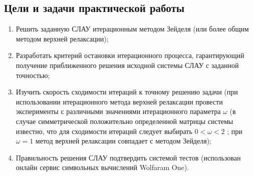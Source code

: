 \documentclass[a4paper,12pt,titlepage,finall]{article}
\begin{document}
\subsection{Цели и задачи практической работы}
\begin{enumerate}
\item
Решить заданную СЛАУ итерационным методом Зейделя (или более общим
методом верхней релаксации);
\item
Разработать критерий остановки итерационного процесса, гарантирующий
получение приближенного решения исходной системы СЛАУ с заданной
точностью;
\item
Изучить скорость сходимости итераций к точному решению задачи (при
использовании итерационного метода верхней релаксации провести эксперименты
с различными значениями итерационного параметра $\omega$ (в случае симметрической
положительно определенной матрицы системы известно, что для сходимости
итераций следует выбирать $0 < \omega < 2$ ; при $\omega = 1$ метод верхней релаксации
совпадает с методом Зейделя);
\item
Правильность решения СЛАУ подтвердить системой тестов (использован онлайн сервис символьных вычислений Wolfaram One).
\end{enumerate}

\newpage
\end{document}
